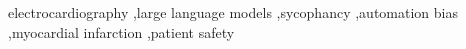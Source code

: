 electrocardiography \sep large language models \sep sycophancy \sep automation bias \sep myocardial infarction \sep patient safety
